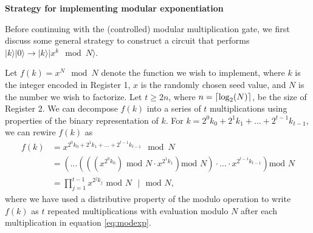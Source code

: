 \documentclass{article}
\DeclarePairedDelimiter\ceil{\lceil}{\rceil}
\begin{document}
\vspace{1em}
\noindent\large{\textbf{Strategy for implementing modular exponentiation}}
\vspace{.5em}

\normalsize 
	Before continuing with the (controlled) modular multiplication gate, we first discuss some general strategy to construct a circuit that performs $|k\rangle|0\rangle \to |k\rangle|x^k \mod N\rangle$. 
    
    Let $f(k) = x^N \mod N$ denote the function we wish to implement, where $k$ is the integer encoded in Register 1, $x$ is the randomly chosen seed value, and $N$ is the number we wish to factorize. Let $t \geq 2n$, where $n = \ceil*{\log_2(N)}$, be the size of Register 2. We can decompose $f(k)$ into a series of $t$ multiplications using properties of the binary representation of $k$. For $k = 2^0k_0 +2^1k_1 + \ldots + 2^{t-1}k_{t-1}$, we can rewire $f(k)$ as
    \begin{align}
    f(k) &= x^{2^0k_0 +2^1k_1 + \ldots + 2^{t-1}k_{t-1}} \mod N \nonumber \\ 
    &= \left(...\left(\left((x^{2^0k_0}) \text{ mod }N \cdot x^{2^1k_1} \right) \text{mod } N	\right)\cdot ... \cdot x^{2^{t-1}k_{t-1}}\right) \text{mod } N \nonumber \\
    &= \prod_{j=1}^{t-1} x^{2^j k_j} \text{ mod } N \text{  } | \text{  } \text{mod } N,
    \label{eq:modexp}
    \end{align}
where we have used a distributive property of the modulo operation to write $f(k)$ as $t$ repeated multiplications with evaluation modulo $N$ after each multiplication in equation \eqref{eq:modexp}.
\end{document}
